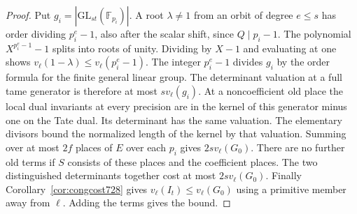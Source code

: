\documentclass[a4paper,11pt]{article}
\theoremstyle{definition}
\theoremstyle{remark}
\numberwithin{equation}{section}
\begin{document}
\begin{proof}
Put \(g_i=|\mathrm{GL}_{st}(\mathbb F_{p_i})|\).
A root \(\lambda\ne1\) from an orbit of degree \(e\le s\)
has order dividing \(p_i^e-1\), also after the scalar shift,
since \(Q\mid p_i-1\). The polynomial \(X^{p_i^e-1}-1\)
splits into roots of unity. Dividing by \(X-1\) and evaluating
at one shows \(v_\ell(1-\lambda)\le v_\ell(p_i^e-1)\).
The integer \(p_i^e-1\) divides \(g_i\) by the order formula
for the finite general linear group. The determinant valuation at
a full tame generator is therefore at most \(s v_\ell(g_i)\).
At a noncoefficient old place the local dual invariants at every
precision are in the kernel of this generator minus one on the
Tate dual. Its determinant has the same valuation. The
elementary divisors bound the normalized length of the kernel
by that valuation. Summing over at most \(2f\) places of \(E\)
over each \(p_i\) gives \(2s v_\ell(G_0)\). There are no further
old terms if \(S\) consists of these places and the coefficient
places. The two distinguished determinants together cost at most
\(2s v_\ell(G_0)\). Finally Corollary~\ref{cor:congcost728}
gives \(v_\ell(I_t)\le v_\ell(G_0)\) using a primitive member
away from \(\ell\). Adding the terms gives the bound.
\end{proof}
\end{document}
